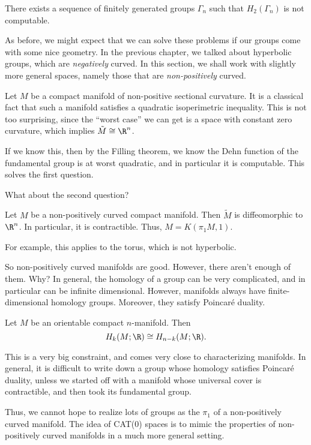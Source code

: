 \documentclass[a4paper]{article}
\begin{document}
\begin{thm}[Gordon] %
  There exists a sequence of finitely generated groups $\Gamma_n$ such that $H_2(\Gamma_n)$ is not computable.
\end{thm}

As before, we might expect that we can solve these problems if our groups come with some nice geometry. In the previous chapter, we talked about hyperbolic groups, which are \emph{negatively} curved. In this section, we shall work with slightly more general spaces, namely those that are \emph{non-positively} curved.

Let $M$ be a compact manifold of non-positive sectional curvature. It is a classical fact that such a manifold satisfies a quadratic isoperimetric inequality. This is not too surprising, since the ``worst case'' we can get is a space with constant zero curvature, which implies $\tilde{M} \cong \R^n$.

If we know this, then by the Filling theorem, we know the Dehn function of the fundamental group is at worst quadratic, and in particular it is computable. This solves the first question.

What about the second question?
\begin{thm}
  Let $M$ be a non-positively curved compact manifold. Then $\tilde{M}$ is diffeomorphic to $\R^n$. In particular, it is contractible. Thus, $M = K(\pi_1 M, 1)$.
\end{thm}
For example, this applies to the torus, which is not hyperbolic.

So non-positively curved manifolds are good. However, there aren't enough of them. Why? In general, the homology of a group can be very complicated, and in particular can be infinite dimensional. However, manifolds always have finite-dimensional homology groups. Moreover, they satisfy Poincar\'e duality.

\begin{thm}
  Let $M$ be an orientable compact $n$-manifold. Then
  \[
    H_k(M; \R) \cong H_{n - k}(M; \R).
  \]
\end{thm}
This is a very big constraint, and comes very close to characterizing manifolds. In general, it is difficult to write down a group whose homology satisfies Poincar\'e duality, unless we started off with a manifold whose universal cover is contractible, and then took its fundamental group.

Thus, we cannot hope to realize lots of groups as the $\pi_1$ of a non-positively curved manifold. The idea of CAT(0) spaces is to mimic the properties of non-positively curved manifolds in a much more general setting.
\end{document}
